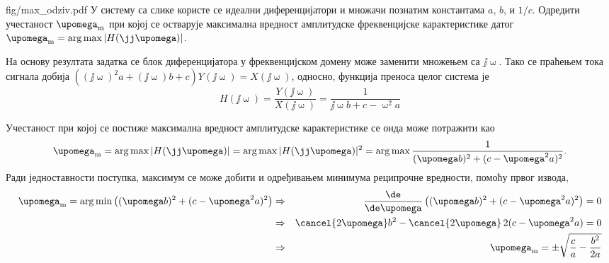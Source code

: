 \noindent
\begin{slikaDesno}{fig/max_odziv.pdf}
    \PID 
    У систему са слике користе се идеални диференцијатори и множачи познатим 
    константама $a$, $b$, и $1/c$. 
    Одредити учестаност $\upomega_{\rm m}$ при којој се остварује максимална 
    вредност амплитудске фреквенцијске карактеристике датог 
    $\upomega_{\rm m} = \arg \max |H(\jj\upomega)|$.     
\end{slikaDesno}

\RESENJE

На основу резултата задатка  се блок диференцијатора у фреквенцијском домену може заменити множењем са 
$\jj\upomega$. Тако се праћењем тока сигнала добија 
$((\jj\upomega)^2 a + (\jj \upomega) b  + c) Y(\jj\upomega) = X(\jj\upomega)$, односно, функција преноса целог система је
\begin{equation}
    H(\jj\upomega) = 
    \dfrac{Y(\jj\upomega)}{X(\jj\upomega)} = \dfrac{1}{  \jj \upomega b  + c - \upomega^2 a}
\end{equation}

Учестаност при којој се постиже максимална вредност амплитудске карактеристике се онда може потражити као 
\begin{equation}
    \upomega_{\rm m} = \arg \max |H(\jj\upomega)| = \arg \max |H(\jj\upomega)|^2 = \arg \max \dfrac{1}{ (\upomega b)^2 + ( c - \upomega^2 a )^2 }.
\end{equation}
Ради једноставности поступка, максимум се може добити и одређивањем минимума реципрочне вредности, помоћу првог извода, 
\begin{eqnarray}
    \upomega_{\rm m} = \arg \min \left(   (\upomega b)^2 + ( c - \upomega^2 a )^2  \right) 
    &\Rightarrow&
    \dfrac{\de }{\de \upomega} \left(   (\upomega b)^2 + ( c - \upomega^2 a )^2  \right) = 0 \\
    &\Rightarrow&
    \cancel{2\upomega} b^2 - \cancel{2\upomega} \, 2 (c - \upomega^2 a) = 0 \\
    &\Rightarrow&
    \upomega_{\rm m} = \pm \sqrt{ \dfrac{c}{a} - \dfrac{b^2}{2a}  }
\end{eqnarray}